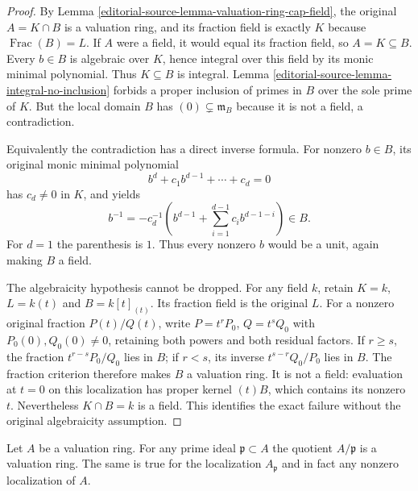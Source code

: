 \begin{proof}
By Lemma \ref{editorial-source-lemma-valuation-ring-cap-field},
the original $A=K\cap B$ is
a valuation ring, and its
fraction field is exactly $K$
because $\operatorname{Frac}(B)=L$.
If $A$ were a field, it
would equal its fraction field,
so $A=K\subseteq B$.
Every $b\in B$ is algebraic
over $K$, hence integral over
this field by its monic
minimal polynomial. Thus
$K\subseteq B$ is integral.
Lemma \ref{editorial-source-lemma-integral-no-inclusion}
forbids a proper inclusion
of primes in $B$ over
the sole prime of $K$.
But the local domain $B$
has $(0)\subsetneq\mathfrak m_B$
because it is not a field,
a contradiction.

Equivalently the contradiction
has a direct inverse formula.
For nonzero $b\in B$, its
original monic minimal polynomial
$$
b^d+c_1b^{d-1}+\cdots+c_d=0
$$
has $c_d\neq0$ in $K$,
and yields
$$
b^{-1}=-c_d^{-1}
\left(b^{d-1}+\sum_{i=1}^{d-1}c_i b^{d-1-i}\right)\in B.
$$
For $d=1$ the parenthesis
is $1$. Thus every nonzero
$b$ would be a unit,
again making $B$ a field.

The algebraicity hypothesis
cannot be dropped. For any
field $k$, retain
$K=k$, $L=k(t)$ and
$B=k[t]_{(t)}$. Its fraction
field is the original $L$.
For a nonzero original
fraction $P(t)/Q(t)$, write
$P=t^rP_0$, $Q=t^sQ_0$
with $P_0(0),Q_0(0)\neq0$,
retaining both powers and
both residual factors.
If $r\geq s$, the fraction
$t^{r-s}P_0/Q_0$ lies in
$B$; if $r<s$, its inverse
$t^{s-r}Q_0/P_0$ lies in
$B$. The fraction criterion
therefore makes $B$ a
valuation ring. It is not
a field: evaluation at $t=0$
on this localization has
proper kernel $(t)B$, which
contains its nonzero $t$.
Nevertheless $K\cap B=k$
is a field. This identifies
the exact failure without
the original algebraicity
assumption.
\end{proof}

\begin{lemma}
\label{editorial-source-lemma-make-valuation-rings}
Let $A$ be a valuation ring. For any prime ideal $\mathfrak p \subset A$ the
quotient $A/\mathfrak p$ is a valuation ring. The same is true for the
localization $A_\mathfrak p$ and in fact any nonzero localization of $A$.
\end{lemma}

